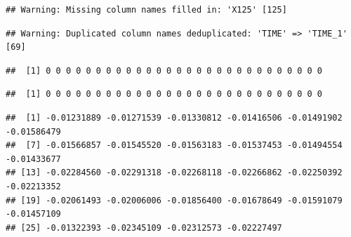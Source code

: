 \documentclass[
]{krantz}
\makeatletter
\newenvironment{Shaded}{\begin{snugshade}}{\end{snugshade}}
\newcommand{\NormalTok}[1]{#1}
\newcommand{\OperatorTok}[1]{\textcolor[rgb]{0.81,0.36,0.00}{\textbf{#1}}}
\newcommand{\StringTok}[1]{\textcolor[rgb]{0.31,0.60,0.02}{#1}}
\newenvironment{kframe}{%
\medskip{}
\setlength{\fboxsep}{.8em}
 \def\at@end@of@kframe{}%
 \ifinner\ifhmode%
  \def\at@end@of@kframe{\end{minipage}}%
  \begin{minipage}{\columnwidth}%
 \fi\fi%
 \def\FrameCommand##1{\hskip\@totalleftmargin \hskip-\fboxsep
 \colorbox{shadecolor}{##1}\hskip-\fboxsep
     \hskip-\linewidth \hskip-\@totalleftmargin \hskip\columnwidth}%
 \MakeFramed {\advance\hsize-\width
   \@totalleftmargin\z@ \linewidth\hsize
   \@setminipage}}%
 {\par\unskip\endMakeFramed%
 \at@end@of@kframe}
\renewenvironment{Shaded}{\begin{kframe}}{\end{kframe}}
\makeatother
\begin{document}
\begin{verbatim}
## Warning: Missing column names filled in: 'X125' [125]
\end{verbatim}

\begin{verbatim}
## Warning: Duplicated column names deduplicated: 'TIME' => 'TIME_1' [69]
\end{verbatim}

\begin{Shaded}
\end{Shaded}

\begin{verbatim}
##  [1] 0 0 0 0 0 0 0 0 0 0 0 0 0 0 0 0 0 0 0 0 0 0 0 0 0 0 0 0
\end{verbatim}

\begin{Shaded}
\end{Shaded}

\begin{verbatim}
##  [1] 0 0 0 0 0 0 0 0 0 0 0 0 0 0 0 0 0 0 0 0 0 0 0 0 0 0 0 0
\end{verbatim}

\begin{Shaded}
\end{Shaded}

\begin{verbatim}
##  [1] -0.01231889 -0.01271539 -0.01330812 -0.01416506 -0.01491902 -0.01586479
##  [7] -0.01566857 -0.01545520 -0.01563183 -0.01537453 -0.01494554 -0.01433677
## [13] -0.02284560 -0.02291318 -0.02268118 -0.02266862 -0.02250392 -0.02213352
## [19] -0.02061493 -0.02006006 -0.01856400 -0.01678649 -0.01591079 -0.01457109
## [25] -0.01322393 -0.02345109 -0.02312573 -0.02227497
\end{verbatim}

\begin{Shaded}
\end{Shaded}
\end{document}
